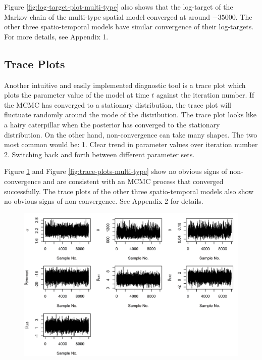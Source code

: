 Figure \ref{fig:log-target-plot-multi-type} also shows that the log-target of the Markov chain of the multi-type spatial model converged at around $-35000$. The other three spatio-temporal models have similar convergence of their log-targets. For more details, see Appendix 1.

\subsection{Trace Plots}

Another intuitive and easily implemented diagnostic tool is a trace plot
which plots the parameter value of the model at time $t$ against the iteration
number. If the MCMC has converged to a stationary distribution, the trace plot will fluctuate randomly around the mode of the distribution. The trace plot looks like a hairy caterpillar when the posterior has converged to the stationary distribution. On the other hand, non-convergence can take many shapes. The two most common would be: 1. Clear trend in parameter values over iteration number 2. Switching back and forth between different parameter sets.

Figure \ref{fig:trace-plots-all-cases} and Figure \ref{fig:trace-plots-multi-type} show no obvious signs of non-convergence and are consistent with an MCMC process that converged successfully. The trace plots of the other three spatio-temporal models also show no obvious signs of non-convergence. See Appendix 2 for details.

\begin{figure}[H]
    \begin{center}
        \includegraphics[scale=1]{Traceplots for Beta and Eta - All Cases.png}
    \end{center}
     \label{fig:trace-plots-all-cases}
\end{figure}

